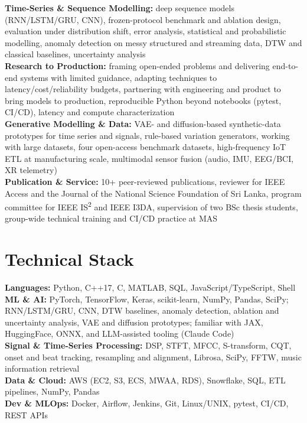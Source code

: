 \documentclass[11pt]{article}
\begin{document}
\textbf{Time-Series \& Sequence Modelling:} deep sequence models (RNN/LSTM/GRU, CNN), frozen-protocol benchmark and ablation design, evaluation under distribution shift, error analysis, statistical and probabilistic modelling, anomaly detection on messy structured and streaming data, DTW and classical baselines, uncertainty analysis\\
\textbf{Research to Production:} framing open-ended problems and delivering end-to-end systems with limited guidance, adapting techniques to latency/cost/reliability budgets, partnering with engineering and product to bring models to production, reproducible Python beyond notebooks (pytest, CI/CD), latency and compute characterization\\
\textbf{Generative Modelling \& Data:} VAE- and diffusion-based synthetic-data prototypes for time series and signals, rule-based variation generators, working with large datasets, four open-access benchmark datasets, high-frequency IoT ETL at manufacturing scale, multimodal sensor fusion (audio, IMU, EEG/BCI, XR telemetry)\\
\textbf{Publication \& Service:} 10+ peer-reviewed publications, reviewer for IEEE Access and the Journal of the National Science Foundation of Sri Lanka, program committee for IEEE IS\textsuperscript{2} and IEEE I3DA, supervision of two BSc thesis students, group-wide technical training and CI/CD practice at MAS

\section*{Technical Stack}

\textbf{Languages:} Python, C++17, C, MATLAB, SQL, JavaScript/TypeScript, Shell\\
\textbf{ML \& AI:} PyTorch, TensorFlow, Keras, scikit-learn, NumPy, Pandas, SciPy; RNN/LSTM/GRU, CNN, DTW baselines, anomaly detection, ablation and uncertainty analysis, VAE and diffusion prototypes; familiar with JAX, HuggingFace, ONNX, and LLM-assisted tooling (Claude Code)\\
\textbf{Signal \& Time-Series Processing:} DSP, STFT, MFCC, S-transform, CQT, onset and beat tracking, resampling and alignment, Librosa, SciPy, FFTW, music information retrieval\\
\textbf{Data \& Cloud:} AWS (EC2, S3, ECS, MWAA, RDS), Snowflake, SQL, ETL pipelines, NumPy, Pandas\\
\textbf{Dev \& MLOps:} Docker, Airflow, Jenkins, Git, Linux/UNIX, pytest, CI/CD, REST APIs
\end{document}
